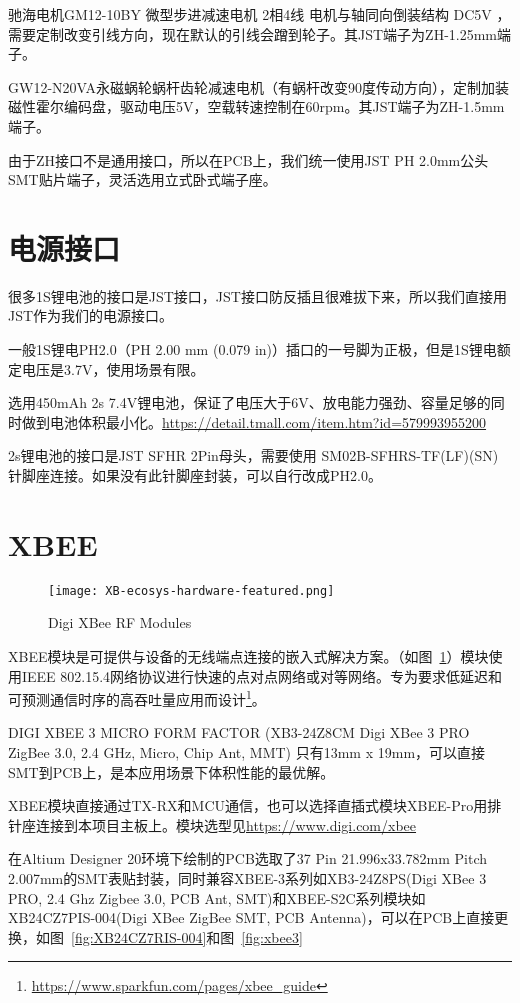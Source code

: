 驰海电机GM12-10BY 微型步进减速电机 2相4线 电机与轴同向倒装结构 DC5V ，需要定制改变引线方向，现在默认的引线会蹭到轮子。其JST端子为ZH-1.25mm端子。

GW12-N20VA永磁蜗轮蜗杆齿轮减速电机（有蜗杆改变90度传动方向），定制加装磁性霍尔编码盘，驱动电压5V，空载转速控制在60rpm。其JST端子为ZH-1.5mm端子。

由于ZH接口不是通用接口，所以在PCB上，我们统一使用JST PH 2.0mm公头SMT贴片端子，灵活选用立式卧式端子座。

\section{电源接口}

很多1S锂电池的接口是JST接口，JST接口防反插且很难拔下来，所以我们直接用JST作为我们的电源接口。

一般1S锂电PH2.0（PH 2.00 mm (0.079 in)）插口的一号脚为正极，但是1S锂电额定电压是3.7V，使用场景有限。

选用450mAh 2s 7.4V锂电池，保证了电压大于6V、放电能力强劲、容量足够的同时做到电池体积最小化。\url{https://detail.tmall.com/item.htm?id=579993955200}

2s锂电池的接口是JST SFHR 2Pin母头，需要使用 SM02B-SFHRS-TF(LF)(SN) 针脚座连接。如果没有此针脚座封装，可以自行改成PH2.0。


\section{XBEE}

\begin{figure}[htbp]
    \centering
    \texttt{[image: XB-ecosys-hardware-featured.png]}
    \caption{Digi XBee RF Modules}
    \label{fig:XB}
\end{figure}

XBEE模块是可提供与设备的无线端点连接的嵌入式解决方案。（如图~\ref{fig:XB}）模块使用IEEE 802.15.4网络协议进行快速的点对点网络或对等网络。专为要求低延迟和可预测通信时序的高吞吐量应用而设计\footnote{\url{https://www.sparkfun.com/pages/xbee_guide}}。

DIGI XBEE 3 MICRO FORM FACTOR (XB3-24Z8CM  Digi XBee 3 PRO ZigBee 3.0, 2.4 GHz, Micro, Chip Ant, MMT) 只有13mm x 19mm，可以直接SMT到PCB上，是本应用场景下体积性能的最优解。

XBEE模块直接通过TX-RX和MCU通信，也可以选择直插式模块XBEE-Pro用排针座连接到本项目主板上。模块选型见\url{https://www.digi.com/xbee}

在Altium Designer 20环境下绘制的PCB选取了37 Pin 21.996x33.782mm Pitch 2.007mm的SMT表贴封装，同时兼容XBEE-3系列如XB3-24Z8PS(Digi XBee 3 PRO, 2.4 Ghz Zigbee 3.0, PCB Ant, SMT)和XBEE-S2C系列模块如XB24CZ7PIS-004(Digi XBee ZigBee SMT, PCB Antenna)，可以在PCB上直接更换，如图~\ref{fig:XB24CZ7RIS-004}和图~\ref{fig:xbee3}

